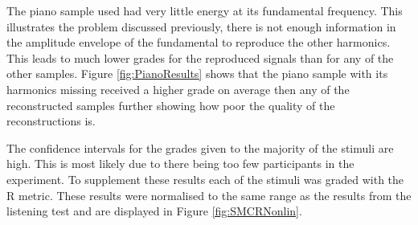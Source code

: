	The piano sample used had very little energy at its fundamental frequency. This illustrates the problem discussed
	previously, there is not enough information in the amplitude envelope of the fundamental to reproduce the other
	harmonics. This leads to much lower grades for the reproduced signals than for any of the other samples. Figure
	\ref{fig:PianoResults} shows that the piano sample with its harmonics missing received a higher grade on average
	then any of the reconstructed samples further showing how poor the quality of the reconstructions is.

	The confidence intervals for the grades given to the majority of the stimuli are high. This is most likely due to
	there being too few participants in the experiment. To supplement these results each of the stimuli was graded with
	the R metric. These results were normalised to the same range as the results from the listening test and
	are displayed in Figure \ref{fig:SMCRNonlin}.

